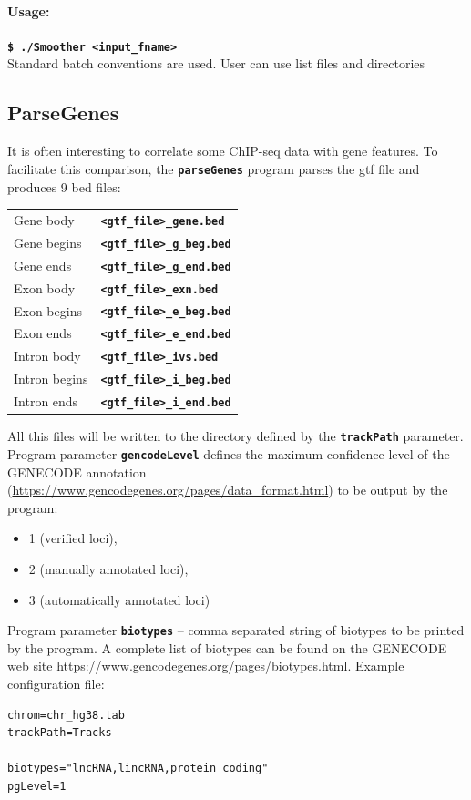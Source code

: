 \documentclass{article}
\newcommand{\prm}[1]{\texttt{\textbf{{#1}}}}
\begin{document}
\paragraph{Usage:}
\prm{\$ ./Smoother <input\_fname>}\\
Standard batch conventions are used. User can use list files and directories
\subsection{ParseGenes}\label{parseGenes}
It is often interesting to correlate some ChIP-seq data with gene features. To facilitate this comparison, the \prm{parseGenes} program parses the gtf file and produces 9 bed files:
\begin{center}
\begin{tabular}{ll}
Gene body&    \prm{<gtf\_file>\_gene.bed}   \\
Gene begins&  \prm{<gtf\_file>\_g\_beg.bed} \\
Gene ends&    \prm{<gtf\_file>\_g\_end.bed} \\
Exon body&    \prm{<gtf\_file>\_exn.bed}    \\
Exon begins&  \prm{<gtf\_file>\_e\_beg.bed} \\
Exon ends&    \prm{<gtf\_file>\_e\_end.bed} \\
Intron body&  \prm{<gtf\_file>\_ivs.bed}    \\
Intron begins&\prm{<gtf\_file>\_i\_beg.bed} \\
Intron ends&  \prm{<gtf\_file>\_i\_end.bed} \\
\end{tabular}
\end{center}


All this files will be written to the directory defined by the \prm{trackPath} parameter.
Program parameter \prm{gencodeLevel} defines the maximum confidence level of the GENECODE annotation (\url{https://www.gencodegenes.org/pages/data_format.html}) to be output by the program:
\begin{itemize}
\item 1 (verified loci),
\item 2 (manually annotated loci),
\item 3 (automatically annotated loci)
\end{itemize}
Program parameter \prm{biotypes} -- comma separated string of biotypes to be printed by the program. 
A complete list of biotypes can be found on the GENECODE web site \url{https://www.gencodegenes.org/pages/biotypes.html}. Example configuration file:
\begin{shaded} 
\begin{verbatim}
chrom=chr_hg38.tab
trackPath=Tracks

biotypes="lncRNA,lincRNA,protein_coding"
pgLevel=1
\end{verbatim}
\end{shaded}
\end{document}
